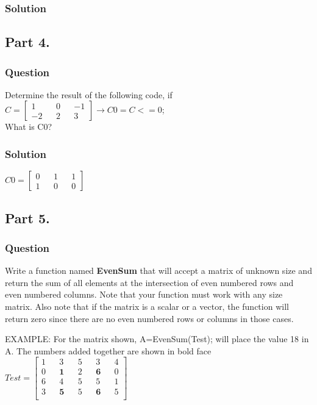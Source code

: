 \documentclass[a4paper, 10pt]{article}
\begin{document}
			\subsubsection{Solution}
				
				\pagebreak
		\subsection{Part 4.}
			\subsubsection{Question}
				\noindent Determine the result of the following code, if $C = \begin{bmatrix} 1 && 0 && -1 \\ -2 && 2 && 3  \end{bmatrix} \rightarrow C0 = C <= 0$;\\
				\noindent What is C0?
			\subsubsection{Solution}
				\vspace {4mm}
				\noindent $C0 = \begin{bmatrix} 0 && 1 && 1 \\ 1 && 0 && 0  \end{bmatrix}$
		\subsection{Part 5.}
			\subsubsection{Question}
				\noindent Write a function named \textbf{EvenSum} that will accept a matrix of unknown size and return the sum of all elements at the intersection of even 
				numbered rows and even numbered columns. Note that your function must work with any size matrix. Also note that if the matrix is a scalar or 
				a vector, the function will return zero since there are no even numbered rows or columns in those
				cases. \\ \vspace{4mm}
				
				\noindent EXAMPLE: For the matrix shown, A=EvenSum(Test); will place the value 18 in A. The numbers added together are shown in bold face \\
				\vspace{3mm} $Test = \begin{bmatrix}
					1 && 3 && 5 && 3 && 4 \\
					0 && \boldsymbol{1} && 2 && \boldsymbol{6} && 0 \\
					6 && 4 && 5 && 5 && 1 \\
					3 && \boldsymbol{5} && 5 && \boldsymbol{6} && 5 \\
				\end{bmatrix}$
\end{document}
